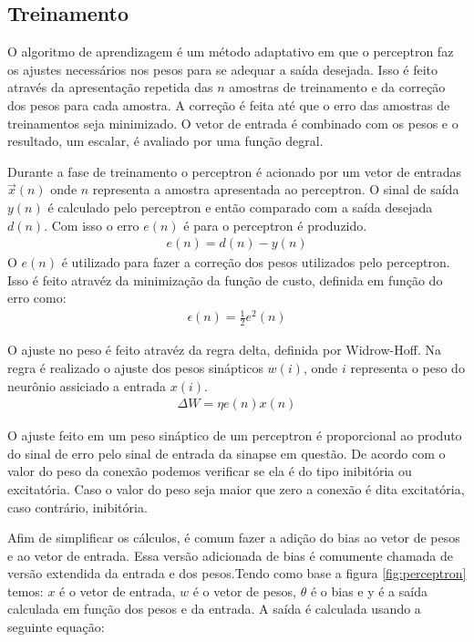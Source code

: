 \documentclass[12pt,journal,onecolumn]{IEEEtran}
\begin{document}
\subsection{Treinamento}
O algoritmo de aprendizagem é um método adaptativo em que o perceptron faz os
ajustes necessários nos pesos para se adequar a saída desejada. Isso é feito
através da apresentação repetida das $n$ amostras de treinamento e da correção
dos pesos para cada amostra.
A correção é feita até que o erro das amostras de treinamentos seja minimizado.
O vetor de entrada é combinado com os pesos e o resultado, um escalar, é
avaliado por uma função degral. 

Durante a fase de treinamento o perceptron é acionado por um vetor de entradas
$\overrightarrow{x}(n)$ onde $n$ representa a amostra apresentada ao perceptron.
O sinal de saída $y(n)$ é calculado pelo perceptron e então comparado com a
saída desejada $d(n)$. Com isso o erro $e(n)$ é para o perceptron é produzido.
\begin{align}
	e(n)=d(n)-y(n)
\end{align}
O $e(n)$ é utilizado para fazer a correção dos pesos utilizados pelo perceptron.
Isso é feito atravéz da minimização da função de custo, definida em função do
erro como:
\begin{align}
	\epsilon(n)=\frac{1}{2}e^2(n)
\end{align}

O ajuste no peso é feito atravéz da regra delta, definida por Widrow-Hoff. Na
regra é realizado o ajuste dos pesos sinápticos  $w(i)$, onde $i$ representa o
peso do neurônio assiciado a entrada $x(i)$.
\begin{align}
		 \Delta W = \eta e(n) x(n)
\end{align}

O ajuste feito em um peso sináptico de um perceptron é proporcional ao produto
do sinal de erro pelo sinal de entrada da sinapse em questão.
De acordo com o valor do peso da conexão podemos verificar se ela é do tipo
inibitória ou excitatória. Caso o valor do peso seja maior que zero a conexão é
dita excitatória, caso contrário, inibitória.

Afim de simplificar os cálculos, é comum fazer a adição do bias ao vetor de
pesos e ao vetor de entrada. Essa versão adicionada de bias é comumente chamada
de versão extendida da entrada e dos pesos.\newline Tendo como base a figura
\ref{fig:perceptron} temos:
$x$ é o vetor de entrada, $w$ é o vetor de pesos, $\theta$ é o bias e y é a
saída calculada em função dos pesos e da entrada.
A saída é calculada usando a seguinte equação:
\end{document}
